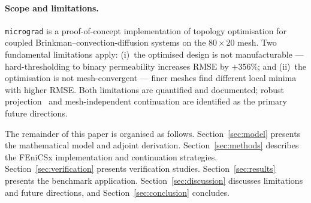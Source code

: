 \paragraph{Scope and limitations.}
\texttt{micrograd} is a proof-of-concept implementation of
topology optimisation for coupled Brinkman--convection-diffusion
systems on the $80\times20$ mesh.
Two fundamental limitations apply:
(i)~the optimised design is not manufacturable --- hard-thresholding
to binary permeability increases RMSE by $+356\%$; and
(ii)~the optimisation is not mesh-convergent --- finer meshes
find different local minima with higher RMSE.
Both limitations are quantified and documented;
robust projection~\cite{wang2011} and mesh-independent continuation
are identified as the primary future directions.

The remainder of this paper is organised as follows.
Section~\ref{sec:model} presents the mathematical model and adjoint
derivation.
Section~\ref{sec:methods} describes the FEniCSx implementation and
continuation strategies.
Section~\ref{sec:verification} presents verification studies.
Section~\ref{sec:results} presents the benchmark application.
Section~\ref{sec:discussion} discusses limitations and future directions,
and Section~\ref{sec:conclusion} concludes.
